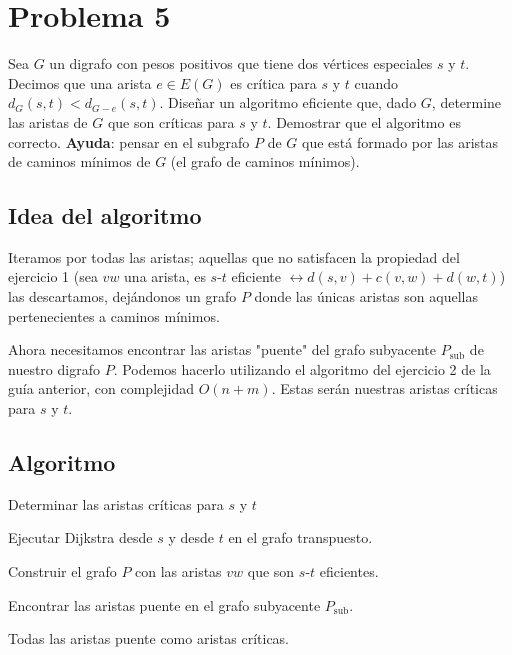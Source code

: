 \documentclass{article}
\begin{document}
\section*{Problema 5}

Sea \( G \) un digrafo con pesos positivos que tiene dos vértices especiales \( s \) y \( t \). Decimos que una arista \( e \in E(G) \) es crítica para \( s \) y \( t \) cuando \( d_G(s, t) < d_{G-e}(s, t) \). Diseñar un algoritmo eficiente que, dado \( G \), determine las aristas de \( G \) que son críticas para \( s \) y \( t \). Demostrar que el algoritmo es correcto. \textbf{Ayuda}: pensar en el subgrafo \( P \) de \( G \) que está formado por las aristas de caminos mínimos de \( G \) (el grafo de caminos mínimos).

\subsection*{Idea del algoritmo}

Iteramos por todas las aristas; aquellas que no satisfacen la propiedad del ejercicio 1 (sea \( vw \) una arista, es \( s \)-\( t \) eficiente \(\leftrightarrow d(s,v) + c(v,w) + d(w,t)\)) las descartamos, dejándonos un grafo \( P \) donde las únicas aristas son aquellas pertenecientes a caminos mínimos.

Ahora necesitamos encontrar las aristas "puente" del grafo subyacente \( P_{\text{sub}} \) de nuestro digrafo \( P \). Podemos hacerlo utilizando el algoritmo del ejercicio 2 de la guía anterior, con complejidad \( O(n + m) \). Estas serán nuestras aristas críticas para \( s \) y \( t \).

\subsection*{Algoritmo}

\begin{algorithm}[H]
\caption{Determinar las aristas críticas para \( s \) y \( t \)}
\begin{algorithmic}[1]
\STATE Ejecutar Dijkstra desde \( s \) y desde \( t \) en el grafo transpuesto.

\vspace{0.5em}

\STATE Construir el grafo \( P \) con las aristas \( vw \) que son \( s \)-\( t \) eficientes.

\vspace{0.5em}

\STATE Encontrar las aristas puente en el grafo subyacente \( P_{\text{sub}} \).

\vspace{0.5em}

\RETURN Todas las aristas puente como aristas críticas.

\end{algorithmic}
\end{algorithm}
\end{document}
